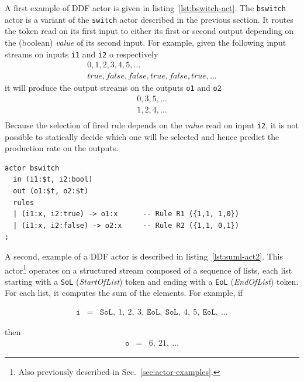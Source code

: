 \medskip
\noindent
A first example of DDF actor is given in listing~\ref{lst:bswitch-act}. The \verb|bswitch| actor is
a variant of the \verb|switch| actor described in the previous section. It
routes the token read on its first input to either its first or second output depending on the
(boolean) \emph{value} of its second input. For example, given the following input streams on inputs \verb|i1| and \verb|i2| o
respectively
\begin{eqnarray*}
  0,        1,     2,    3,     4,    5, \ldots \\
  true, false, false, true, false, true, \ldots
\end{eqnarray*}
it will produce the output streams on the outputs \verb|o1| and \verb|o2|
\begin{eqnarray*}
  0, 3, 5, \ldots \\
  1, 2, 4, \ldots \\
\end{eqnarray*}
Because the selection of fired rule depends on the \emph{value} read on input \texttt{i2}, it is
not possible to statically decide which one will be selected and hence predict the production rate on
the outputs.

\begin{lstlisting}[caption={A simple DDF actor in CAPH},label=lst:bswitch-act]
actor bswitch
  in (i1:$t, i2:bool)
  out (o1:$t, o2:$t)
  rules
  | (i1:x, i2:true) -> o1:x      -- Rule R1 ({1,1, 1,0})
  | (i1:x, i2:false) -> o2:x     -- Rule R2 ({1,1, 0,1})
;
\end{lstlisting}

\medskip
\noindent
A second, example of a DDF actor is described in listing~\ref{lst:suml-act2}. This
actor\footnote{Also previously described in Sec.~\ref{sec:actor-examples}.}
operates on a structured stream composed of a sequence of lists, each list starting with a
\verb|SoL| (\emph{StartOfList}) token and ending with a \verb|EoL| (\emph{EndOfList}) token. For each
list, it computes the sum of the elements.
For example, if

\begin{eqnarray*}
\mathtt{i} & = & \mathtt{SoL},\ 1,\ 2,\ 3,\ \mathtt{EoL},\ \mathtt{SoL},\ 4,\ 5,\ \mathtt{EoL},\ \ldots
\end{eqnarray*}

\noindent
then
\begin{eqnarray*}
\mathtt{o} & = & 6,\ 21,\ \ldots
\end{eqnarray*}


